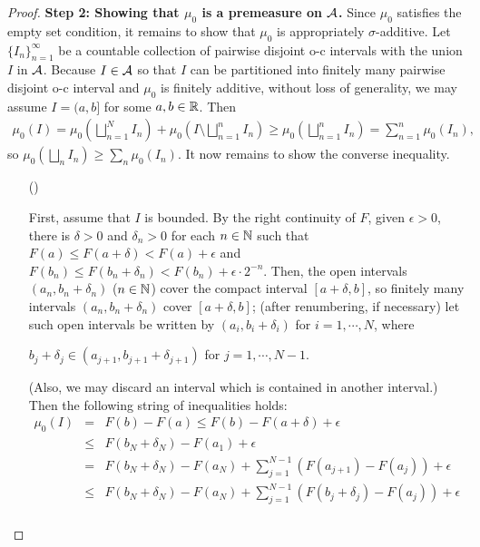 \begin{proof}
    \textbf{Step 2: Showing that $\mu_0$ is a premeasure on ${\mathcal{A}}$.}\newline\noindent
    Since $\mu_0$ satisfies the empty set condition, it remains to show that $\mu_0$ is appropriately $\sigma$-additive.
    Let $\{I_n\}_{n=1}^\infty$ be a countable collection of pairwise disjoint o-c intervals with the union $I$ in ${\mathcal{A}}$.
    Because $I\in{\mathcal{A}}$ so that $I$ can be partitioned into finitely many pairwise disjoint o-c interval and $\mu_0$ is finitely additive, without loss of generality, we may assume $I=(a, b]$ for some $a, b\in{\mathbb{R}}$.
    Then
    \begin{align*}
        \mu_0(I)=\mu_0\left(\bigsqcup_{n=1}^N I_n\right)+\mu_0\left(I\setminus\bigsqcup_{n=1}^n I_n\right)\geq\mu_0\left(\bigsqcup_{n=1}^n I_n\right)=\sum_{n=1}^n\mu_0(I_n),
    \end{align*}
    so $\mu_0(\bigsqcup_n I_n)\geq\sum_n\mu_0(I_n)$.
    It now remains to show the converse inequality.
    \begin{enumerate}
        \item[(\romannumeral 1)]
        {
            First, assume that $I$ is bounded.
            By the right continuity of $F$, given $\epsilon>0$, there is $\delta>0$ and $\delta_n>0$ for each $n\in{\mathbb{N}}$ such that $F(a)\leq F(a+\delta)<F(a)+\epsilon$ and $F(b_n)\leq F(b_n+\delta_n)<F(b_n)+\epsilon\cdot 2^{-n}$.
            Then, the open intervals $(a_n, b_n+\delta_n)$ ($n\in{\mathbb{N}}$) cover the compact interval $[a+\delta, b]$, so finitely many intervals $(a_n, b_n+\delta_n)$ cover $[a+\delta, b]$; (after renumbering, if necessary) let such open intervals be written by $(a_i, b_i+\delta_i)$ for $i=1, \cdots, N$, where
            \begin{center}
                $b_j+\delta_j\in(a_{j+1}, b_{j+1}+\delta_{j+1})$ for $j=1, \cdots, N-1$.
            \end{center}
            (Also, we may discard an interval which is contained in another interval.)
            Then the following string of inequalities holds:
            \begin{eqnarray*}
                \mu_0(I)
                &=&F(b)-F(a)\leq F(b)-F(a+\delta)+\epsilon\\
                &\leq&F(b_N+\delta_N)-F(a_1)+\epsilon\\
                &=&F(b_N+\delta_N)-F(a_N)+\sum_{j=1}^{N-1}(F(a_{j+1})-F(a_j))+\epsilon\\
                &\leq&F(b_N+\delta_N)-F(a_N)+\sum_{j=1}^{N-1}(F(b_j+\delta_j)-F(a_j))+\epsilon\\

\end{eqnarray*}}
\end{enumerate}
\end{proof}
